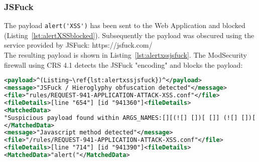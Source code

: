 %
%
%

\subsubsection{JSFuck}
The payload \verb|alert('XSS')| has been sent to the Web Application and blocked (Listing~\ref{lst:alertXSSblocked}). Subsequently the payload was obscured using the service provided by JSFuck: https://jsfuck.com/ \\
The resulting payload is shown in Listing~\ref{lst:alertxssjsfuck}. The ModSecurity firewall using CRS 4.1 detects the JSFuck "encoding" and blocks the payload:

\begin{lstlisting}[style=ruleStyle, language=XML, caption=alert('XSS') in JSFuck blocked, label={lst:alertxssjsfuckblocked}]
<payload>^(Listing~\ref{lst:alertxssjsfuck})^</payload>
<message>"JSFuck / Hieroglyphy obfuscation detected"</message>
<file>"rules/REQUEST-941-APPLICATION-ATTACK-XSS.conf"</file>
<fileDetails>[line "654"] [id "941360"]<fileDetails>
<MatchedData>
"Suspicious payload found within ARGS_NAMES:[][(![] [])[ []] (![] [])[! [] ! []] (![] [])[ ! []] (!![] [])[ []]][([][(![] [])[ []] (![] [])[! [] ! []] (![] [])[ ! []] (!![] [])[ []]] [])[ (11337 characters omitted)"
</MatchedData>
<message>"Javascript method detected"</message>
<file>"/rules/REQUEST-941-APPLICATION-ATTACK-XSS.conf"</file>
<fileDetails>[line "714"] [id "941390"]<fileDetails>
<MatchedData>"alert("</MatchedData>
\end{lstlisting}


